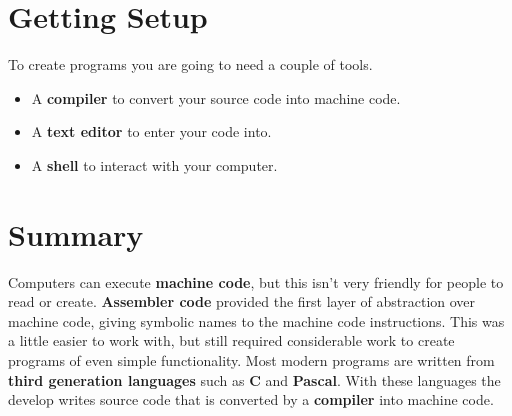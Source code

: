 



% 








\section{Getting Setup} %
\label{sec:getting_setup}

To create programs you are going to need a couple of tools.

\begin{itemize}
  \item A \textbf{compiler} to convert your source code into machine code.
  \item A \textbf{text editor} to enter your code into.
  \item A \textbf{shell} to interact with your computer.
\end{itemize}




\section{Summary} %
\label{sec:summary-compilers}

Computers can execute \textbf{machine code}, but this isn't very friendly for people to read or create. \textbf{Assembler code} provided the first layer of abstraction over machine code, giving symbolic names to the machine code instructions. This was a little easier to work with, but still required considerable work to create programs of even simple functionality. Most modern programs are written from \textbf{third generation languages} such as \textbf{C} and \textbf{Pascal}. With these languages the develop writes source code that is converted by a \textbf{compiler} into machine code.


